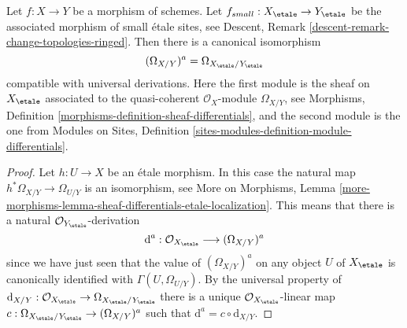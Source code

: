 \begin{lemma}
\label{lemma-match-modules-differentials}
Let $f : X \to Y$ be a morphism of schemes. Let
$f_{small} : X_\etale \to Y_\etale$ be the associated
morphism of small \'etale sites, see
Descent, Remark \ref{descent-remark-change-topologies-ringed}.
Then there is a canonical isomorphism
$$
(\Omega_{X/Y})^a = \Omega_{X_\etale/Y_\etale}
$$
compatible with universal derivations. Here the first module
is the sheaf on $X_\etale$ associated
to the quasi-coherent $\mathcal{O}_X$-module $\Omega_{X/Y}$, see
Morphisms, Definition \ref{morphisms-definition-sheaf-differentials},
and the second module is the one from
Modules on Sites,
Definition \ref{sites-modules-definition-module-differentials}.
\end{lemma}

\begin{proof}
Let $h : U \to X$ be an \'etale morphism. In this case the natural map
$h^*\Omega_{X/Y} \to \Omega_{U/Y}$ is an isomorphism, see
More on Morphisms,
Lemma \ref{more-morphisms-lemma-sheaf-differentials-etale-localization}.
This means that there is a natural $\mathcal{O}_{Y_\etale}$-derivation
$$
\text{d}^a : \mathcal{O}_{X_\etale} \longrightarrow (\Omega_{X/Y})^a
$$
since we have just seen that the value of $(\Omega_{X/Y})^a$ on any object
$U$ of $X_\etale$ is canonically identified with
$\Gamma(U, \Omega_{U/Y})$. By the universal property of
$\text{d}_{X/Y} :
\mathcal{O}_{X_\etale}
\to
\Omega_{X_\etale/Y_\etale}$
there is a unique $\mathcal{O}_{X_\etale}$-linear map
$c : \Omega_{X_\etale/Y_\etale} \to (\Omega_{X/Y})^a$
such that
$\text{d}^a = c \circ \text{d}_{X/Y}$.


\end{proof}
